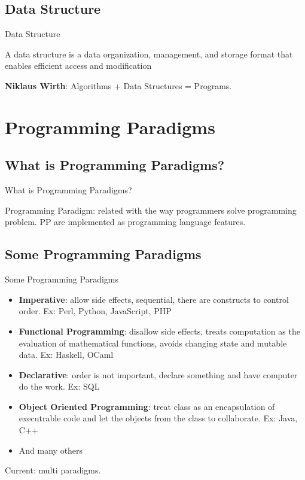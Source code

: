 \documentclass[10pt]{beamer}
\begin{document}
  \subsection{Data Structure}

    \begin{frame}[fragile]{Data Structure}

A data structure is a data organization, management, and storage format that enables efficient access and modification

\textbf{Niklaus Wirth}: Algorithms + Data Structures = Programs.

    \end{frame}

\section{Programming Paradigms}

  \subsection{What is Programming Paradigms?}

    \begin{frame}[fragile]{What is Programming Paradigms?}

      Programming Paradigm: related with the way programmers solve programming problem. PP are implemented as programming language features.

    \end{frame}

  \subsection{Some Programming Paradigms}

    \begin{frame}[fragile]{Some Programming Paradigms}

      \begin{itemize}
        \item \textbf{Imperative}: allow side effects, sequential, there are constructs to control order. Ex: Perl, Python, JavaScript, PHP
        \item \textbf{Functional Programming}: disallow side effects, treats computation as the evaluation of mathematical functions, avoids changing state and mutable data. Ex: Haskell, OCaml
        \item \textbf{Declarative}: order is not important, declare something and have computer do the work. Ex: SQL
        \item \textbf{Object Oriented Programming}: treat class as an encapsulation of executrable code and let the objects from the class to collaborate. Ex: Java, C++
        \item And many others
      \end{itemize}

      Current: multi paradigms.

    \end{frame}
\end{document}
